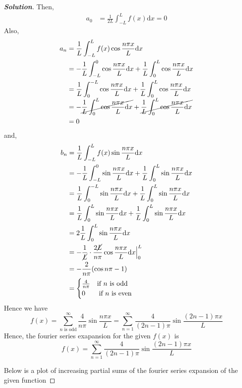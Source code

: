 \documentclass[10pt]{scrartcl}
\theoremstyle{definition}
\newenvironment{solution} {\begin{proof}[\normalfont \textbf{Solution}]} {\end{proof}}
\newcommand{\npixL}{\frac{n\pi x}{L}}
\newcommand{\dx}{\mathrm{d}x}
\begin{document}
\begin{solution}
    Then, 
    \begin{align*}
        a_0 &= \frac{1}{2L}\int_{-L}^{L}f(x)\dx = 0
    \end{align*}
    Also, 
    \begin{align*}
        a_n &= \frac{1}{L} \int_{-L}^{L}f(x)\cos\frac{n\pi x}{L}\dx \\
            &= -\frac{1}{L} \int_{-L}^{0} \cos \npixL \dx + \frac{1}{L} \int_{0}^{L}\cos \npixL \dx\\
            &= \frac{1}{L} \int_{0}^{-L} \cos \npixL \dx + \frac{1}{L} \int_{0}^{L}\cos \npixL \dx\\
            &= -\cancel{\frac{1}{L} \int_{0}^{L} \cos \npixL \dx} + \cancel{\frac{1}{L} \int_{0}^{L}\cos \npixL \dx}\\
            &= 0
    \end{align*}
    and,
    \begin{align*}
        b_n &=\frac{1}{L} \int_{-L}^{L}f(x)\sin\frac{n\pi x}{L}\dx \\
            &= -\frac{1}{L}\int_{-L}^{0} \sin \npixL \dx + \frac{1}{L}\int_{0}^{L}\sin \npixL \dx\\
            &= \frac{1}{L}\int_{0}^{-L} \sin \npixL \dx + \frac{1}{L}\int_{0}^{L}\sin \npixL \dx\\
            &= \frac{1}{L}\int_{0}^{L} \sin \npixL \dx + \frac{1}{L}\int_{0}^{L}\sin \npixL \dx\\
            &= 2\frac{1}{L}\int_{0}^{L} \sin \npixL \dx\\
            &= -\frac{1}{\cancel{L}} \cdot \frac{2\cancel{L}}{n\pi}\cos \npixL \dx\Big|_{0}^{L} \\
            &= -\frac{2}{n\pi}(\cos n \pi -1)\\
            &= 
            \begin{cases}
                \frac{4}{n\pi} ~~\text{ if $n$ is odd}\\ 
                0 ~~~~~\text{ if $n$ is even}
            \end{cases}
    \end{align*}
    Hence we have
    $$f(x) = \sum_{n \text{ is odd}}^{\infty} \frac{4}{n\pi}\sin\npixL = \sum_{n=1}^{\infty}\frac{4}{(2n -1)\pi} \sin \frac{(2n -1)\pi x}{L}$$
    Hence, the fourier series exapansion for the given $f(x)$ is 
    $$\boxed{f(x) = \sum_{n=1}^{\infty}\frac{4}{(2n -1)\pi} \sin \frac{(2n -1)\pi x}{L}}$$

    Below is a plot of increasing partial sums of the fourier series expansion of the given function


\end{solution}
\end{document}
